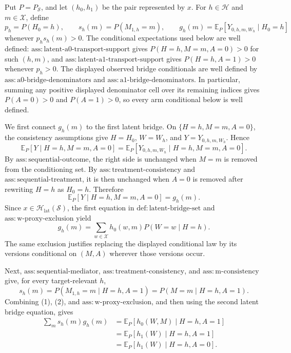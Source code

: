 Put \(P=P_{\mathcal S}\), and let \((h_0,h_1)\) be the pair represented by
\(x\).  For \(h\in\mathcal H\) and \(m\in\mathcal X\), define
\[
 p_h=P(H_0=h),\qquad s_h(m)=P(M_{1,h}=m),\qquad
 g_h(m)=\mathbb E_P[Y_{0,h,m,W_h}\mid H_0=h]
\]
whenever \(p_hs_h(m)>0\).  The conditional expectations used below are well
defined: \(\mathrm{ass{:}latent\text{-}a0\text{-}transport\text{-}support}\)
gives \(P(H=h,M=m,A=0)>0\) for such \((h,m)\), and
\(\mathrm{ass{:}latent\text{-}a1\text{-}transport\text{-}support}\) gives
\(P(H=h,A=1)>0\) whenever \(p_h>0\).  The displayed observed bridge
conditionals are well defined by
\(\mathrm{ass{:}a0\text{-}bridge\text{-}denominators}\) and
\(\mathrm{ass{:}a1\text{-}bridge\text{-}denominators}\).
In particular, summing any positive displayed denominator cell over its remaining
indices gives \(P(A=0)>0\) and \(P(A=1)>0\), so every arm conditional below is
well defined.

We first connect \(g_h(m)\) to the first latent bridge.  On
\(\{H=h,M=m,A=0\}\), the consistency assumptions give
\(H=H_0\), \(W=W_h\), and \(Y=Y_{0,h,m,W_h}\).  Hence
\[
 \mathbb E_P[Y\mid H=h,M=m,A=0]
 =\mathbb E_P[Y_{0,h,m,W_h}\mid H=h,M=m,A=0].
\]
By \(\mathrm{ass{:}sequential\text{-}outcome}\), the right side is unchanged
when \(M=m\) is removed from the conditioning set.  By
\(\mathrm{ass{:}treatment\text{-}consistency}\) and
\(\mathrm{ass{:}sequential\text{-}treatment}\), it is then unchanged when
\(A=0\) is removed after rewriting \(H=h\) as \(H_0=h\).  Therefore
\[
 \mathbb E_P[Y\mid H=h,M=m,A=0]=g_h(m).
\]
Since \(x\in\mathcal H_{\mathrm{lat}}(\mathcal S)\), the first equation in
\(\mathrm{def{:}latent\text{-}bridge\text{-}set}\) and
\(\mathrm{ass{:}w\text{-}proxy\text{-}exclusion}\) yield
\[
 g_h(m)=\sum_{w\in\mathcal X}h_0(w,m)P(W=w\mid H=h).
 \tag{1}
\]
The same exclusion justifies replacing the displayed conditional law by its
versions conditional on \((M,A)\) wherever those versions occur.

Next, \(\mathrm{ass{:}sequential\text{-}mediator}\),
\(\mathrm{ass{:}treatment\text{-}consistency}\), and
\(\mathrm{ass{:}m\text{-}consistency}\) give, for every target-relevant \(h\),
\[
 s_h(m)=P(M_{1,h}=m\mid H=h,A=1)=P(M=m\mid H=h,A=1).
 \tag{2}
\]
Combining (1), (2), and
\(\mathrm{ass{:}w\text{-}proxy\text{-}exclusion}\), and then using the second
latent bridge equation, gives
\[
 \begin{aligned}
 \sum_m s_h(m)g_h(m)
 &=\mathbb E_P[h_0(W,M)\mid H=h,A=1]\\
 &=\mathbb E_P[h_1(W)\mid H=h,A=1]\\
 &=\mathbb E_P[h_1(W)\mid H=h,A=0].
 \end{aligned}
 \tag{3}
\]

